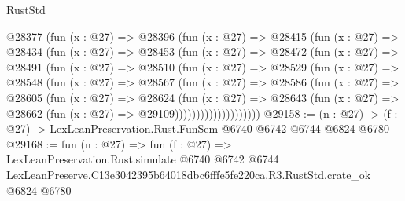 \begin{lexlean}{RustStd}
\begin{coremodule}
          @28377
            (fun (x : @27) =>
            @28396
              (fun (x : @27) =>
              @28415
                (fun (x : @27) =>
                @28434
                  (fun (x : @27) =>
                  @28453
                    (fun (x : @27) =>
                    @28472
                      (fun (x : @27) =>
                      @28491
                        (fun (x : @27) =>
                        @28510
                          (fun (x : @27) =>
                          @28529
                            (fun (x : @27) =>
                            @28548
                              (fun (x : @27) =>
                              @28567
                                (fun (x : @27) =>
                                @28586
                                  (fun (x : @27) =>
                                  @28605
                                    (fun (x : @27) =>
                                    @28624
                                      (fun (x : @27) =>
                                      @28643
                                        (fun (x : @27) =>
                                        @28662 (fun (x : @27) => @29109))))))))))))))))))))
@29158 := (n : @27) -> (f : @27) -> LexLeanPreservation.Rust.FunSem @6740 @6742 @6744 @6824 @6780
@29168 := fun (n : @27) =>
  fun (f : @27) =>
  LexLeanPreservation.Rust.simulate
    @6740
    @6742
    @6744
    LexLeanPreserve.C13e3042395b64018dbc6fffe5fe220ca.R3.RustStd.crate_ok
    @6824
    @6780
\end{coremodule}
\end{lexlean}
